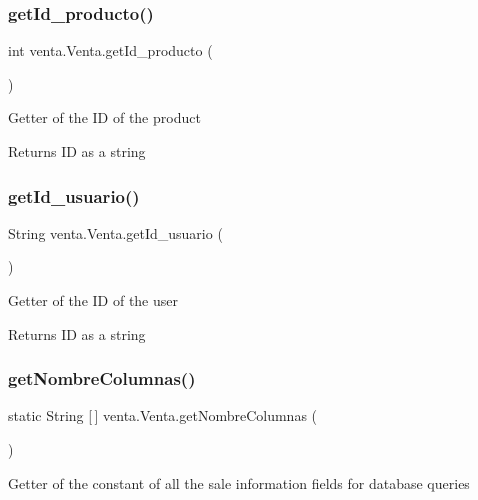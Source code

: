 \subsubsection{\texorpdfstring{get\+Id\+\_\+producto()}{getId\_producto()}}
{\footnotesize\ttfamily int venta.\+Venta.\+get\+Id\+\_\+producto (\begin{DoxyParamCaption}{ }\end{DoxyParamCaption})}

Getter of the ID of the product

\begin{DoxyReturn}{Returns}
ID as a string 
\end{DoxyReturn}
\mbox{\label{classventa_1_1_venta_a4ff2b190dba80f9bf653e24e0b820e54}} 
\subsubsection{\texorpdfstring{get\+Id\+\_\+usuario()}{getId\_usuario()}}
{\footnotesize\ttfamily String venta.\+Venta.\+get\+Id\+\_\+usuario (\begin{DoxyParamCaption}{ }\end{DoxyParamCaption})}

Getter of the ID of the user

\begin{DoxyReturn}{Returns}
ID as a string 
\end{DoxyReturn}
\mbox{\label{classventa_1_1_venta_a517a4e2b36e633e0adab951596a733ed}} 
\subsubsection{\texorpdfstring{get\+Nombre\+Columnas()}{getNombreColumnas()}}
{\footnotesize\ttfamily static String \mbox{[}$\,$\mbox{]} venta.\+Venta.\+get\+Nombre\+Columnas (\begin{DoxyParamCaption}{ }\end{DoxyParamCaption})\hspace{0.3cm}{\ttfamily [static]}}

Getter of the constant of all the sale information fields for database queries

